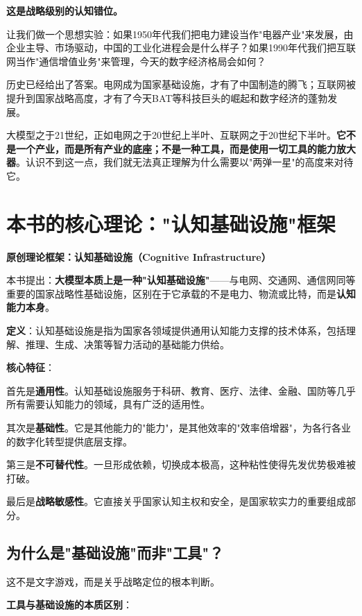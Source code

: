 \textbf{这是战略级别的认知错位。}

让我们做一个思想实验：如果1950年代我们把电力建设当作"电器产业"来发展，由企业主导、市场驱动，中国的工业化进程会是什么样子？如果1990年代我们把互联网当作"通信增值业务"来管理，今天的数字经济格局会如何？

历史已经给出了答案。电网成为国家基础设施，才有了中国制造的腾飞；互联网被提升到国家战略高度，才有了今天BAT等科技巨头的崛起和数字经济的蓬勃发展。

大模型之于21世纪，正如电网之于20世纪上半叶、互联网之于20世纪下半叶。\textbf{它不是一个产业，而是所有产业的底座；不是一种工具，而是使用一切工具的能力放大器}。认识不到这一点，我们就无法真正理解为什么需要以"两弹一星"的高度来对待它。

\section{本书的核心理论："认知基础设施"框架}

\textbf{原创理论框架：认知基础设施（Cognitive Infrastructure）}

本书提出：\textbf{大模型本质上是一种"认知基础设施"}——与电网、交通网、通信网同等重要的国家战略性基础设施，区别在于它承载的不是电力、物流或比特，而是\textbf{认知能力本身}。

\textbf{定义}：认知基础设施是指为国家各领域提供通用认知能力支撑的技术体系，包括理解、推理、生成、决策等智力活动的基础能力供给。

\textbf{核心特征}：

首先是\textbf{通用性}。认知基础设施服务于科研、教育、医疗、法律、金融、国防等几乎所有需要认知能力的领域，具有广泛的适用性。

其次是\textbf{基础性}。它是其他能力的"能力"，是其他效率的"效率倍增器"，为各行各业的数字化转型提供底层支撑。

第三是\textbf{不可替代性}。一旦形成依赖，切换成本极高，这种粘性使得先发优势极难被打破。

最后是\textbf{战略敏感性}。它直接关乎国家认知主权和安全，是国家软实力的重要组成部分。

\subsection{为什么是"基础设施"而非"工具"？}

这不是文字游戏，而是关乎战略定位的根本判断。

\textbf{工具与基础设施的本质区别}：

